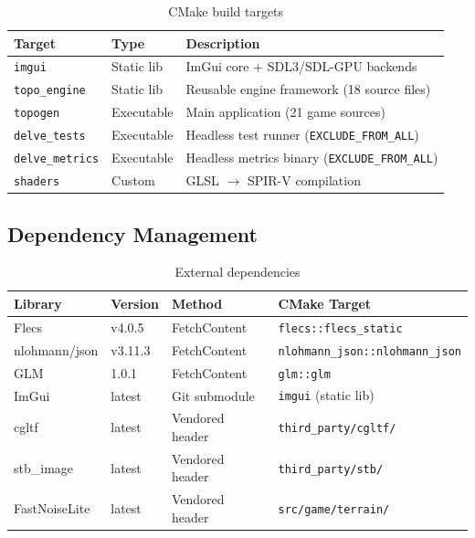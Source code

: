 \documentclass[11pt,a4paper]{article}
\begin{document}
\begin{table}[h]
\centering
\caption{CMake build targets}
\label{tab:targets}
\begin{tabular}{@{}llp{7cm}@{}}
\toprule
\textbf{Target} & \textbf{Type} & \textbf{Description} \\
\midrule
\texttt{imgui}         & Static lib  & ImGui core + SDL3/SDL-GPU backends \\
\texttt{topo\_engine}  & Static lib  & Reusable engine framework (18 source files) \\
\texttt{topogen}       & Executable  & Main application (21 game sources) \\
\texttt{delve\_tests}  & Executable  & Headless test runner (\texttt{EXCLUDE\_FROM\_ALL}) \\
\texttt{delve\_metrics}& Executable  & Headless metrics binary (\texttt{EXCLUDE\_FROM\_ALL}) \\
\texttt{shaders}       & Custom      & GLSL $\to$ SPIR-V compilation \\
\bottomrule
\end{tabular}
\end{table}

\subsection{Dependency Management}

\begin{table}[h]
\centering
\caption{External dependencies}
\label{tab:deps}
\begin{tabular}{@{}lllp{5.5cm}@{}}
\toprule
\textbf{Library} & \textbf{Version} & \textbf{Method} & \textbf{CMake Target} \\
\midrule
Flecs          & v4.0.5  & FetchContent & \texttt{flecs::flecs\_static} \\
nlohmann/json  & v3.11.3 & FetchContent & \texttt{nlohmann\_json::nlohmann\_json} \\
GLM            & 1.0.1   & FetchContent & \texttt{glm::glm} \\
ImGui          & latest  & Git submodule & \texttt{imgui} (static lib) \\
cgltf          & latest  & Vendored header & \texttt{third\_party/cgltf/} \\
stb\_image     & latest  & Vendored header & \texttt{third\_party/stb/} \\
FastNoiseLite  & latest  & Vendored header & \texttt{src/game/terrain/} \\
\bottomrule
\end{tabular}
\end{table}
\end{document}
